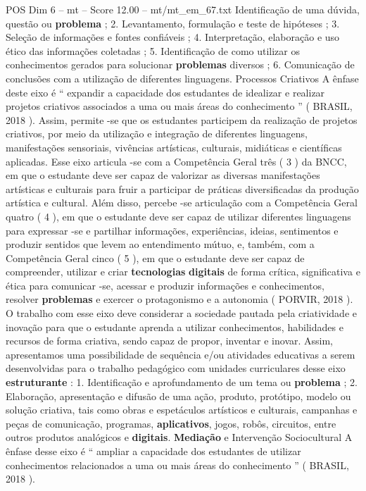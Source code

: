 \begin{textsample}{POS Dim 6 – mt – Score 12.00 – mt/mt\_em\_67.txt}
Identificação de uma dúvida, questão ou \textbf{problema} ; 2.
Levantamento, formulação e teste de hipóteses ; 3.
Seleção de informações e fontes confiáveis ; 4.
Interpretação, elaboração e uso ético das informações coletadas ; 5.
Identificação de como utilizar os conhecimentos gerados para solucionar \textbf{problemas} diversos ; 6.
Comunicação de conclusões com a utilização de diferentes linguagens.
Processos Criativos A ênfase deste eixo é “ expandir a capacidade dos estudantes de idealizar e realizar projetos criativos associados a uma ou mais áreas do conhecimento ” ( BRASIL, 2018 ).
Assim, permite -se que os estudantes participem da realização de projetos criativos, por meio da utilização e integração de diferentes linguagens, manifestações sensoriais, vivências artísticas, culturais, midiáticas e científicas aplicadas.
Esse eixo articula -se com a Competência Geral três ( 3 ) da BNCC, em que o estudante deve ser capaz de valorizar as diversas manifestações artísticas e culturais para fruir a participar de práticas diversificadas da produção artística e cultural.
Além disso, percebe -se articulação com a Competência Geral quatro ( 4 ), em que o estudante deve ser capaz de utilizar diferentes linguagens para expressar -se e partilhar informações, experiências, ideias, sentimentos e produzir sentidos que levem ao entendimento mútuo, e, também, com a Competência Geral cinco ( 5 ), em que o estudante deve ser capaz de compreender, utilizar e criar \textbf{tecnologias} \textbf{digitais} de forma crítica, significativa e ética para comunicar -se, acessar e produzir informações e conhecimentos, resolver \textbf{problemas} e exercer o protagonismo e a autonomia ( PORVIR, 2018 ).
O trabalho com esse eixo deve considerar a sociedade pautada pela criatividade e inovação para que o estudante aprenda a utilizar conhecimentos, habilidades e recursos de forma criativa, sendo capaz de propor, inventar e inovar.
Assim, apresentamos uma possibilidade de sequência e/ou atividades educativas a serem desenvolvidas para o trabalho pedagógico com unidades curriculares desse eixo \textbf{estruturante} : 1.
Identificação e aprofundamento de um tema ou \textbf{problema} ; 2.
Elaboração, apresentação e difusão de uma ação, produto, protótipo, modelo ou solução criativa, tais como obras e espetáculos artísticos e culturais, campanhas e peças de comunicação, programas, \textbf{aplicativos}, jogos, robôs, circuitos, entre outros produtos analógicos e \textbf{digitais}. \textbf{Mediação} e Intervenção Sociocultural A ênfase desse eixo é “ ampliar a capacidade dos estudantes de utilizar conhecimentos relacionados a uma ou mais áreas do conhecimento ” ( BRASIL, 2018 ).

\end{textsample}
